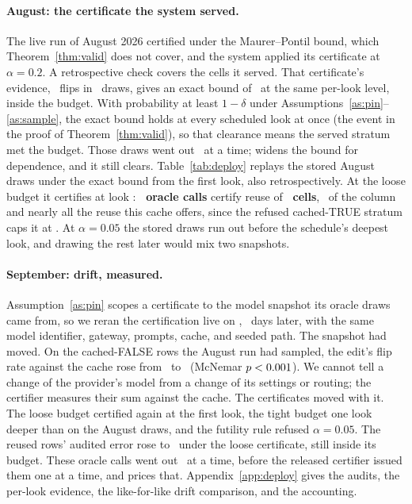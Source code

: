 \keeprunin
\paragraph{August: the certificate the system served.} The live run
of August 2026 certified under the Maurer--Pontil bound, which
Theorem~\ref{thm:valid} does not cover, and the system applied its
certificate at $\alpha{=}0.2$. A retrospective check covers the cells it
served. That certificate's evidence, \deployMpFlipsLoose\ flips in
\deployMpLookLoose\ draws, gives an exact bound of \deployExactLoose\ at
the same per-look level, inside the budget. With probability at least $1-\delta$ under
Assumptions~\ref{as:pin}--\ref{as:sample}, the exact bound holds at
every scheduled look at once (the event in the proof of
Theorem~\ref{thm:valid}), so that clearance means the served stratum met
the budget. Those draws went out \deployConcurrency\ at a time;
 widens the bound for dependence, and it still
clears.
Table~\ref{tab:deploy} replays the stored August draws under the exact
bound from the first look, also retrospectively. At the loose budget it
certifies at look \deployLookLoose: \textbf{\deployOracle\ oracle
calls} certify reuse of \textbf{\deployReused\ cells}, \deploySavings\
of the column and nearly all the reuse this cache offers, since the
refused cached-TRUE stratum caps it at \deployCeiling. At
$\alpha{=}0.05$ the stored draws run out before the schedule's deepest
look, and drawing the rest later would mix two snapshots.

\keeprunin
\paragraph{September: drift, measured.} Assumption~\ref{as:pin}
scopes a certificate to the model snapshot its oracle draws came from,
so we reran the certification live on \sepSnapshotDate,
\driftDaysLater\ days later, with the same model identifier, gateway,
prompts, cache, and seeded path. The snapshot had moved. On the
cached-FALSE rows the August run had sampled, the edit's flip rate
against the cache rose from \driftFalseAugEdit\ to \driftFalseSepEdit\
(McNemar $p<0.001$). We cannot tell a change of the provider's model from a change of its
settings or routing; the certifier measures their sum against the cache. The certificates
moved with it. The loose budget certified again at the first look, the
tight budget one look deeper than on the August draws, and the futility
rule refused $\alpha{=}0.05$. The reused rows' audited error rose to
\sepRealizedLoose\ under the loose certificate, still inside its budget.
These oracle calls went out \deployConcurrency\ at a time, before the
released certifier issued them one at a time, and
\secref{sec:exp-validity} prices that. Appendix~\ref{app:deploy} gives
the audits, the per-look evidence, the like-for-like drift comparison,
and the accounting.

